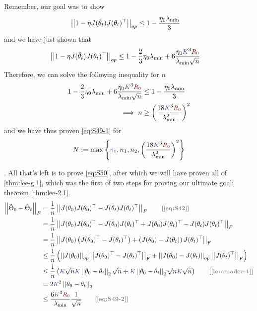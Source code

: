 \documentclass{article}
\begin{document}
\begin{appendices}
Remember, our goal was to show 
\begin{align}
	\norm[op]{1 - \eta J(\tilde\theta_t) J(\theta_t)^\top}
		&\leq  1 - \frac{\eta_0 \lambda_{\text{min}}}{3}
\end{align}
and we have just shown that 
\begin{align}
	\norm[op]{1 - \eta J(\tilde\theta_t) J(\theta_t)^\top}
	&\leq  1 - \frac{2}{3} \eta_0 \lambda_{\text{min}} + 6 \frac{\eta_0 \k^3 \r}{\lambda_{\text{min}} \sqrt{n}}
\end{align}
Therefore, we can solve the following inequality for $n$ 
\begin{align}
	1 - \frac{2}{3} \eta_0 \lambda_{\text{min}} + 6 \frac{\eta_0 \k^3 \r}{\lambda_{\text{min}} \sqrt{n}}	
		&\leq  1 - \frac{\eta_0 \lambda_{\text{min}}}{3} \\
	\implies n 
		&\geq \lr{  \frac{18 \k^3 \r}{\lambda_{\text{min}}^2}   }^2
\end{align}
and we have thus proven \ref{eq:S49-1} for 
\begin{align}
	N := \max\left\{  \n, n_1, n_2,   \lr{  \frac{18 \k^3 \r}{\lambda_{\text{min}}^2}   }^2 \right\}
\end{align}

. All that's left is to prove \ref{eq:S50}, after which we will have proven all of \ref{thm:lee-g.1}, which was the first of two steps for proving our ultimate goal: theorem \ref{thm:lee-2.1}. 
\begin{align}
	\norm[F]{\hat\Theta_0 - \hat\Theta_t} 
		&= \inv{n} \norm[F]{J(\theta_0) J(\theta_0)^\top  - J(\theta_t) J(\theta_t)^\top }
			\qquad \mtgray{[\ref{eq:S42}]} \\
		&= \inv{n} \norm[F]{ J(\theta_0) J(\theta_0)^\top - J(\theta_0)J(\theta_t)^\top + J(\theta_0)J(\theta_t)^\top - J(\theta_t) J(\theta_t)^\top  } \\
		&= \inv{n} \norm[F]{ J(\theta_0) \lr{ J(\theta_0)^\top - J(\theta_t)^\top }    + \lr{J(\theta_0) - J(\theta_t)} J(\theta_t)^\top } \\
		&\leq \inv{n} \lr{
			\norm[op]{J(\theta_0)} \norm[F]{ J(\theta_0)^\top - J(\theta_t)^\top } 
			+ \norm[op]{J(\theta_0) - J(\theta_t)} \norm[F]{J(\theta_t)^\top}
		} \\
		&\leq \inv{n} \lr{ 
			\k \sqrt{n} \k \norm{\theta_0 - \theta_t} \sqrt{n}
			+ \k \norm{\theta_0 - \theta_t} \sqrt{n} \k \sqrt{n}
	  } \qquad \mtgray{[\ref{lemma:lee-1}]} \\
  		&= 2\k^2 \norm{\theta_0 - \theta_t} \\
  		&\leq \frac{6\k^3 \r}{\lambda_{\text{min}}} \inv{\sqrt n} 
  			\qquad \mtgray{[\ref{eq:S49-2}]}
\end{align}




\end{appendices}
\end{document}
